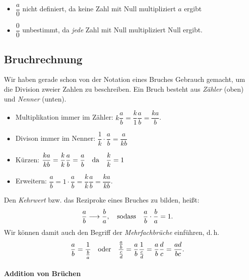 \begin{itemize}
    \item $\dfrac{a}{0}$ nicht definiert, da keine Zahl mit Null multipliziert $a$ ergibt 
    \item $\dfrac{0}{0}$ unbestimmt, da \emph{jede} Zahl mit Null multipliziert Null ergibt.
\end{itemize}

\subsection{Bruchrechnung}

Wir haben gerade schon von der Notation eines Bruches Gebrauch gemacht, um die Division zweier Zahlen zu beschreiben. Ein Bruch besteht aus \emph{Zähler} (oben) und \emph{Nenner} (unten).
\begin{itemize}
    \item Multiplikation immer im Zähler: $k \dfrac{a}{b} = \dfrac{k}{1}\dfrac{a}{b} = \dfrac{ka}{b}$. 
    \item Divison immer im Nenner: $\dfrac{1}{k}\cdot \dfrac{a}{b} = \dfrac{a}{kb}$
    \item Kürzen: $\dfrac{k a}{kb} = \dfrac{k}{k} \dfrac{a}{b} = \dfrac{a}{b} \qq{da} \dfrac{k}{k}=1$
    \item Erweitern: $\dfrac{a}{b} = 1\cdot \dfrac{a}{b} = \dfrac{k}{k}\dfrac{a}{b} = \dfrac{ka}{kb}$.
\end{itemize}
Den \emph{Kehrwert} bzw. das Reziproke eines Bruches zu bilden, heißt:
\begin{align}
    \frac{a}{b} \longrightarrow \frac{b}{a}, \qq{sodass} \frac{a}{b}\cdot\frac{b}{a} = 1.
\end{align}
Wir können damit auch den Begriff der \emph{Mehrfachbrüche} einführen, d.\,h. 
\begin{align}
    \frac{a}{b} = \frac{1}{\frac{b}{a}} \qq{oder} \frac{\frac{a}{b}}{\frac{c}{d}} = \frac{a}{b} \frac{1}{\frac{c}{d}} = \frac{a}{b}\frac{d}{c} = \frac{ad}{bc}.
\end{align}

\paragraph{Addition von Brüchen}$~$

